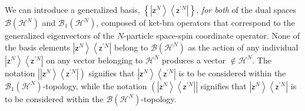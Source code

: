 \documentclass[aps,preprint]{revtex4}%
\begin{document}
We can introduce a generalized basis, $\left\{  \left\vert \mathsf{z}%
^{N}\right\rangle \left\langle \mathsf{z}^{\prime N}\right\vert \right\}  $,
\emph{for both} of the dual spaces $\mathcal{B}\left(  \mathcal{H}^{N}\right)
$ and $\mathcal{B}_{1}\left(  \mathcal{H}^{N}\right)  $, composed of ket-bra
operators that correspond to the generalized eigenvectors of the $N$-particle
space-spin coordinate operator. None of the basis elements $\left\vert
\mathsf{z}^{N}\right\rangle \left\langle \mathsf{z}^{\prime N}\right\vert $
belong to $\mathcal{B}\left(  \mathcal{H}^{N}\right)  $ as the action of any
individual $\left\vert \mathsf{z}^{N}\right\rangle \left\langle \mathsf{z}%
^{\prime N}\right\vert $ on any vector belonging to $\mathcal{H}^{N}$ produces
a vector $\notin\mathcal{H}^{N}$. The notation $\left\vert \left\vert
\mathsf{z}^{N}\right\rangle \left\langle \mathsf{z}^{\prime N}\right\vert
\right)  $ signifies that $\left\vert \mathsf{z}^{N}\right\rangle \left\langle
\mathsf{z}^{\prime N}\right\vert $ is to be considered within the
$\mathcal{B}_{1}\left(  \mathcal{H}^{N}\right)  $-topology, while the notation
$\left(  \left\vert \mathsf{z}^{N}\right\rangle \left\langle \mathsf{z}%
^{\prime N}\right\vert \right\vert $ signifies that $\left\vert \mathsf{z}%
^{N}\right\rangle \left\langle \mathsf{z}^{\prime N}\right\vert $ is to be
considered within the $\mathcal{B}\left(  \mathcal{H}^{N}\right)  $-topology.
\end{document}

